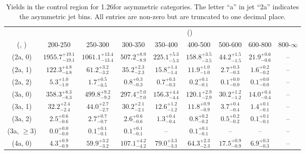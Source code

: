 \begin{table}[h!]
\tiny
\centering
\caption{Yields in the \mj control region for 1.26\ifb for asymmetric categories. The letter ``a'' in jet \eg ``2a''  indicates the asymmetric jet bins. All entries are non-zero but are truncated to one decimal place.\label{tab:yieldssep_mu_wjetstolnuht_asym}}
\begin{tabular}
{ccccccccc}
	\hline\hline
&	& \multicolumn{8}{c}{\scalht (\gev)} \\ 
	 (\njet,  \nb) & 200-250 & 250-300 & 300-350 & 350-400 & 400-500 & 500-600 & 600-800 & 800-$\infty$ \\ [0.8ex] 
\hline
	(2a, 0) & $1955.7^{+ 19.1 }_{- 19.1 }$ & $1061.1^{+ 13.4 }_{- 13.4 }$ & $507.2^{+ 8.9 }_{- 8.9 }$ & $225.1^{+ 5.3 }_{- 5.3 }$ & $158.8^{+ 3.5 }_{- 3.5 }$ & $44.2^{+ 1.5 }_{- 1.5 }$ & $21.9^{+ 0.6 }_{- 0.6 }$ & -- \\[0.5ex] 
	(2a, 1) & $122.3^{+ 4.8 }_{- 4.8 }$ & $61.2^{+ 3.2 }_{- 3.2 }$ & $35.2^{+ 2.3 }_{- 2.3 }$ & $15.8^{+ 1.4 }_{- 1.4 }$ & $11.9^{+ 1.0 }_{- 1.0 }$ & $2.7^{+ 0.3 }_{- 0.3 }$ & $1.6^{+ 0.2 }_{- 0.2 }$ & -- \\[0.5ex] 
	(2a, 2) & $5.3^{+ 1.0 }_{- 1.0 }$ & $1.7^{+ 0.5 }_{- 0.5 }$ & $0.8^{+ 0.3 }_{- 0.3 }$ & $0.7^{+ 0.3 }_{- 0.3 }$ & $0.2^{+ 0.1 }_{- 0.1 }$ & $0.1^{+ 0.0 }_{- 0.0 }$ & $0.1^{+ 0.0 }_{- 0.0 }$ & -- \\[0.5ex] 
	(3a, 0) & $358.3^{+ 8.3 }_{- 8.3 }$ & $499.8^{+ 9.2 }_{- 9.2 }$ & $297.4^{+ 7.0 }_{- 7.0 }$ & $156.3^{+ 4.4 }_{- 4.4 }$ & $120.1^{+ 2.9 }_{- 2.9 }$ & $30.2^{+ 1.2 }_{- 1.2 }$ & $14.0^{+ 0.4 }_{- 0.4 }$ & -- \\[0.5ex] 
	(3a, 1) & $32.2^{+ 2.4 }_{- 2.4 }$ & $44.0^{+ 2.7 }_{- 2.7 }$ & $30.2^{+ 2.1 }_{- 2.1 }$ & $12.6^{+ 1.2 }_{- 1.2 }$ & $11.8^{+ 0.9 }_{- 0.9 }$ & $3.7^{+ 0.4 }_{- 0.4 }$ & $1.4^{+ 0.1 }_{- 0.1 }$ & -- \\[0.5ex] 
	(3a, 2) & $2.5^{+ 0.6 }_{- 0.6 }$ & $2.7^{+ 0.7 }_{- 0.7 }$ & $2.6^{+ 0.6 }_{- 0.6 }$ & $1.3^{+ 0.4 }_{- 0.4 }$ & $0.8^{+ 0.2 }_{- 0.2 }$ & $0.5^{+ 0.2 }_{- 0.2 }$ & $0.1^{+ 0.1 }_{- 0.1 }$ & -- \\[0.5ex] 
	(3a, $\ge3$) & $0.0^{+ 0.0 }_{- 0.0 }$ & $0.1^{+ 0.1 }_{- 0.1 }$ & $0.1^{+ 0.1 }_{- 0.1 }$ & -- & $0.1^{+ 0.1 }_{- 0.1 }$ & -- & -- & -- \\[0.5ex] 
	(4a, 0) & $4.3^{+ 0.9 }_{- 0.9 }$ & $59.9^{+ 3.2 }_{- 3.2 }$ & $107.1^{+ 4.2 }_{- 4.2 }$ & $79.0^{+ 3.3 }_{- 3.3 }$ & $64.3^{+ 2.3 }_{- 2.3 }$ & $17.5^{+ 0.9 }_{- 0.9 }$ & $6.9^{+ 0.3 }_{- 0.3 }$ & -- \\[0.5ex] 

\end{tabular}
\end{table}
